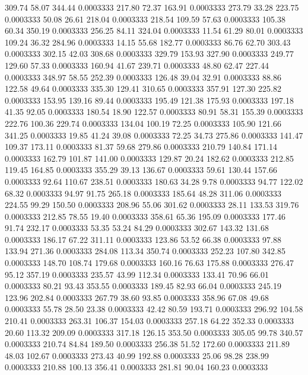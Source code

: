  309.74   58.07  344.44   0.0003333
 217.80   72.37  163.91   0.0003333
 273.79   33.28  223.75   0.0003333
  50.08   26.61  218.04   0.0003333
 218.54  109.59   57.63   0.0003333
 105.38   60.34  350.19   0.0003333
 256.25   84.11  324.04   0.0003333
  11.54   61.29   80.01   0.0003333
 109.24   36.32  284.96   0.0003333
  14.15   55.68  182.77   0.0003333
  86.76   62.70  303.43   0.0003333
 302.15   42.03  308.68   0.0003333
 329.79  153.93  327.90   0.0003333
 249.77  129.60   57.33   0.0003333
 160.94   41.67  239.71   0.0003333
  48.80   62.47  227.44   0.0003333
 348.97   58.55  252.39   0.0003333
 126.48   39.04   32.91   0.0003333
  88.86  122.58   49.64   0.0003333
 335.30  129.41  310.65   0.0003333
 357.91  127.30  225.82   0.0003333
 153.95  139.16   89.44   0.0003333
 195.49  121.38  175.93   0.0003333
 197.18   41.35   92.05   0.0003333
 180.54   18.90  122.57   0.0003333
  80.91   58.31  155.39   0.0003333
 222.76  100.36  229.74   0.0003333
 134.04  100.19   72.25   0.0003333
 105.90  121.66  341.25   0.0003333
  19.85   41.24   39.08   0.0003333
  72.25   34.73  275.86   0.0003333
 141.47  109.37  173.11   0.0003333
  81.37   59.68  279.86   0.0003333
 210.79  140.84  171.14   0.0003333
 162.79  101.87  141.00   0.0003333
 129.87   20.24  182.62   0.0003333
 212.85  119.45  164.85   0.0003333
 355.29   39.13  136.67   0.0003333
  59.61  130.44  157.66   0.0003333
  92.64  110.67  238.51   0.0003333
 180.63   34.28    9.78   0.0003333
  94.77  122.02   68.32   0.0003333
  94.97   91.75  265.18   0.0003333
 185.64   48.28  311.06   0.0003333
 224.55   99.29  150.50   0.0003333
 208.96   55.06  301.62   0.0003333
  28.11  133.53  319.76   0.0003333
 212.85   78.55   19.40   0.0003333
 358.61   65.36  195.09   0.0003333
 177.46   91.74  232.17   0.0003333
  53.35   53.24   84.29   0.0003333
 302.67  143.32  131.68   0.0003333
 186.17   67.22  311.11   0.0003333
 123.86   53.52   66.38   0.0003333
  97.88  133.94  271.36   0.0003333
 284.08  113.34  350.74   0.0003333
 252.23  107.80  342.85   0.0003333
 148.70  108.74  179.68   0.0003333
 160.16   76.63  175.88   0.0003333
 276.47   95.12  357.19   0.0003333
 235.57   43.99  112.34   0.0003333
 133.41   70.96   66.01   0.0003333
  80.21   93.43  353.55   0.0003333
 189.45   82.93   66.04   0.0003333
 245.19  123.96  202.84   0.0003333
 267.79   38.60   93.85   0.0003333
 358.96   67.08   49.68   0.0003333
  55.78   28.50   23.38   0.0003333
  42.42   80.59  193.71   0.0003333
 296.92  104.58  210.41   0.0003333
 263.31  106.37  154.03   0.0003333
 257.18   64.22  352.33   0.0003333
  20.60  113.32  209.09   0.0003333
 317.18  126.15  353.50   0.0003333
 305.05   99.78  340.57   0.0003333
 210.74   84.84  189.50   0.0003333
 256.38   51.52  172.60   0.0003333
 211.89   48.03  102.67   0.0003333
 273.43   40.99  192.88   0.0003333
  25.06   98.28  238.99   0.0003333
 210.88  100.13  356.41   0.0003333
 281.81   90.04  160.23   0.0003333

